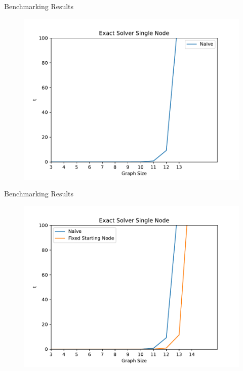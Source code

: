 \begin{frame}{Benchmarking Results}
  \vspace{-0.25cm}
  \begin{figure}
    \includegraphics[width=\linewidth,height=.9\textheight,keepaspectratio]{./assets/v0.pdf}
  \end{figure}
\end{frame}
\begin{frame}{Benchmarking Results}
  \vspace{-0.25cm}
  \begin{figure}
    \includegraphics[width=\linewidth,height=.9\textheight,keepaspectratio]{./assets/v1.pdf}
  \end{figure}
\end{frame}

